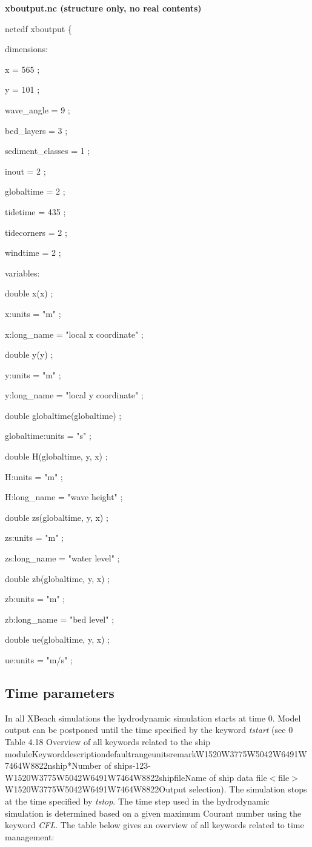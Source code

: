 \documentclass{article}
\begin{document}
\noindent \textbf{xboutput.nc (structure only, no real contents)}

\noindent netcdf xboutput \{

\noindent dimensions:

 x = 565 ;

 y = 101 ;

 wave\_angle = 9 ;

 bed\_layers = 3 ;

 sediment\_classes = 1 ;

 inout = 2 ;

 globaltime = 2 ;

 tidetime = 435 ;

 tidecorners = 2 ;

 windtime = 2 ;

\noindent variables:

 double x(x) ;

  x:units = "m" ;

  x:long\_name = "local x coordinate" ;

 double y(y) ;

  y:units = "m" ;

  y:long\_name = "local y coordinate" ;

 double globaltime(globaltime) ;

  globaltime:units = "s" ;

 double H(globaltime, y, x) ;

  H:units = "m" ;

  H:long\_name = "wave height" ;

 double zs(globaltime, y, x) ;

  zs:units = "m" ;

  zs:long\_name = "water level" ;

 double zb(globaltime, y, x) ;

  zb:units = "m" ;

  zb:long\_name = "bed level" ;

 double ue(globaltime, y, x) ;

  ue:units = "m/s" ;


\subsection{ Time parameters}

\noindent In all XBeach simulations the hydrodynamic simulation starts at time 0. Model output can be postponed until the time specified by the keyword \textit{tstart }(see 0 Table 4.18 Overview of all keywords related to the ship moduleKeyworddescriptiondefaultrangeunitsremarkW1520W3775W5042W6491W7464W8822nship*Number of ships-123-W1520W3775W5042W6491W7464W8822shipfileName of ship data file$<$file$>$W1520W3775W5042W6491W7464W8822Output selection). The simulation stops at the time specified by \textit{tstop}. The time step used in the hydrodynamic simulation is determined based on a given maximum Courant number using the keyword \textit{CFL}. The table below gives an overview of all keywords related to time management:
\end{document}
